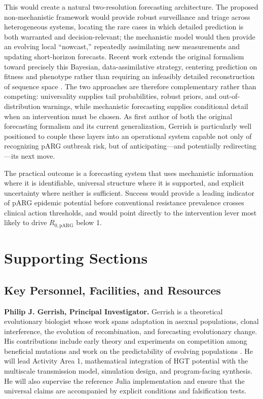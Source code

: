 \documentclass[12pt,a4paper]{article}
\newcommand{\RpARG}{R_{0,\mathrm{pARG}}}
\begin{document}
This would create a natural two-resolution forecasting architecture. The proposed non-mechanistic framework would provide robust surveillance and triage across heterogeneous systems, locating the rare cases in which detailed prediction is both warranted and decision-relevant; the mechanistic model would then provide an evolving local ``nowcast,'' repeatedly assimilating new measurements and updating short-horizon forecasts. Recent work extends the original formalism toward precisely this Bayesian, data-assimilative strategy, centering prediction on fitness and phenotype rather than requiring an infeasibly detailed reconstruction of sequence space \citep{gerrish2026forecasting}. The two approaches are therefore complementary rather than competing: universality supplies tail probabilities, robust priors, and out-of-distribution warnings, while mechanistic forecasting supplies conditional detail when an intervention must be chosen. As first author of both the original forecasting formalism and its current generalization, Gerrish is particularly well positioned to couple these layers into an operational system capable not only of recognizing pARG outbreak risk, but of anticipating---and potentially redirecting---its next move.

The practical outcome is a forecasting system that uses mechanistic information where it is identifiable, universal structure where it is supported, and explicit uncertainty where neither is sufficient. Success would provide a leading indicator of pARG epidemic potential before conventional resistance prevalence crosses clinical action thresholds, and would point directly to the intervention lever most likely to drive $\RpARG$ below 1.

\newpage

\section*{Supporting Sections}

\subsection*{Key Personnel, Facilities, and Resources}

\textbf{Philip J. Gerrish, Principal Investigator.} Gerrish is a theoretical evolutionary biologist whose work spans adaptation in asexual populations, clonal interference, the evolution of recombination, and forecasting evolutionary change. His contributions include early theory and experiments on competition among beneficial mutations and work on the predictability of evolving populations \citep{gerrish1998,devisser1999,gerrish2012}. He will lead Activity Area 1, mathematical integration of HGT potential with the multiscale transmission model, simulation design, and program-facing synthesis. He will also supervise the reference Julia implementation and ensure that the universal claims are accompanied by explicit conditions and falsification tests.
\end{document}
